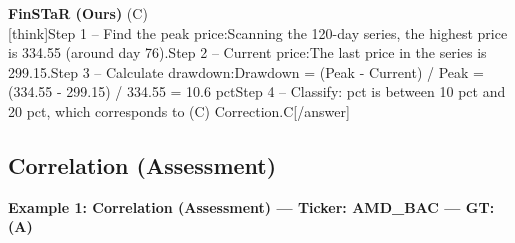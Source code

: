 \begin{minipage}[t]{0.41\textwidth}
\colorbox{green!10}{\parbox{\dimexpr\textwidth-2\fboxsep}{
\textbf{FinSTaR (Ours)} \textcolor{green!50!black}{(C)} \\[2pt]
\tiny
[think]\newline Step 1 -- Find the peak price:\newline Scanning the 120-day series, the highest price is 334.55 (around day 76).\newline Step 2 -- Current price:\newline The last price in the series is 299.15.\newline Step 3 -- Calculate drawdown:\newline Drawdown = (Peak - Current) / Peak = (334.55 - 299.15) / 334.55 = 10.6 pct\newline Step 4 -- Classify: pct is between 10 pct and 20 pct, which corresponds to (C) Correction.\newline [/think]\newline [answer]C[/answer]
}}
\vspace{-30pt}
\end{minipage}

\clearpage
\subsection{Correlation (Assessment)}


\noindent
\textbf{Example 1: Correlation (Assessment) --- Ticker: AMD\_BAC --- GT: (A)}
\vspace{2pt}

